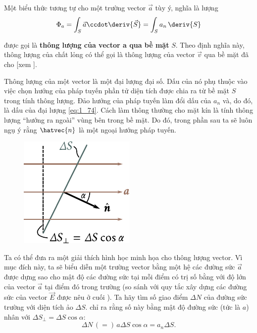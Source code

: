 \noindent
Một biểu thức tương tự cho một trường vector $\vec{a}$ tùy ý, nghĩa là lượng
\begin{equation}\label{eq:1_74}
	\Phi_a = \int_S \vec{a} \ccdot \deriv{\vec{S}} = \int_S a_n\, \deriv{S}
\end{equation}

\noindent
được gọi là \textbf{thông lượng của vector a qua bề mặt} $S$. Theo định nghĩa này, thông lượng của chất lỏng có thể gọi là thông lượng của vector $\vec{v}$ qua bề mặt đã cho [xem ].

Thông lượng của một vector là một đại lượng đại số. Dấu của nó phụ thuộc vào việc chọn hướng của pháp tuyến phần tử diện tích được chia ra từ bề mặt $S$ trong tính thông lượng. Đảo hướng của pháp tuyến làm đổi dấu của $a_n$ và, do đó, là dấu của đại lượng \eqref{eq:1_74}. Cách làm thông thường cho mặt kín là tính thông lượng ``hướng ra ngoài'' vùng bên trong bề mặt. Do đó, trong phần sau ta sẽ luôn ngụ ý rằng $\hatvec{n}$ là một ngoại hướng pháp tuyến.

\begin{figure}[!htb]
	\begin{center}
		\includegraphics[scale=0.95]{figures/ch_01/fig_1_20.pdf}
		\caption[]{}
		\label{fig:1_20}
	\end{center}
	\vspace{-1.0cm}
\end{figure}

Ta có thể đưa ra một giải thích hình học minh họa cho thông lượng vector. Vì mục đích này, ta sẽ biểu diễn một trường vector bằng một hệ các đường sức $\vec{a}$ được dựng sao cho mật độ các đường sức tại mỗi điểm có trị số bằng với độ lớn của vector $\vec{a}$ tại điểm đó trong trường (so sánh với quy tắc xây dựng các đường sức của vector $\vec{E}$ được nêu ở cuối ). Ta hãy tìm số giao điểm $\Delta{N}$ của đường sức trường với diện tích ảo $\Delta{S}$.  chỉ ra rằng số này bằng mật độ đường sức (tức là $a$) nhân với $\Delta{S}_{\perp}=\Delta{S}\cos\alpha$:
\begin{equation*}
	\Delta{N}\, (=)\, a \Delta{S}\cos\alpha = a_n \Delta{S}.
\end{equation*}

